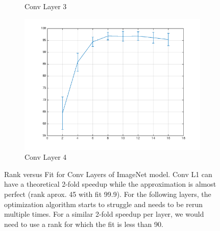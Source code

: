 \begin{figure}[!htb]
\begin{subfigure}[h]{0.40\textwidth}
    \caption{Conv Layer 3}
  \end{subfigure}
  \begin{subfigure}[h]{0.40\textwidth}
    \includegraphics[width=\textwidth]{images/Layer4ImageNet.png}
    \caption{Conv Layer 4}
  \end{subfigure}
  \caption{Rank versus Fit for Conv Layers of ImageNet model. Conv L1 can have a theoretical 2-fold speedup while the approximation is almost perfect (rank aprox. 45 with fit 99.9). For the following layers, the optimization algorithm starts to struggle and needs to be rerun multiple times. For a similar 2-fold speedup per layer, we would need to use a rank for which the fit is less than 90.}
  \label{fig:user_artiststribution}
\end{figure}
